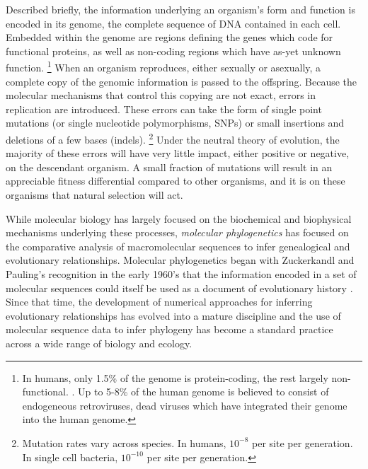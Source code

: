Described briefly, the information underlying an organism's form and function is encoded in its genome, the complete sequence of DNA contained in each cell.
Embedded within the genome are regions defining the genes which code for functional proteins, as well as non-coding regions which have as-yet unknown function.
\footnote{In humans, only 1.5\% of the genome is protein-coding, the rest largely non-functional. \cite{Lander:2001hk}. Up to 5-8\% of the human genome is believed to consist of endogeneous retroviruses, dead viruses which have integrated their genome into the human genome.}
When an organism reproduces, either sexually or asexually, a complete copy of the genomic information is passed to the offspring.
Because the molecular mechanisms that control this copying are not exact, errors in replication are introduced.
These errors can take the form of single point mutations (or single nucleotide polymorphisms, SNPs) or small insertions and deletions of a few bases (indels).
\footnote{Mutation rates vary across species. In humans, $10^{-8}$ per site per generation. In single cell bacteria, $10^{-10}$ per site per generation.}
Under the neutral theory of evolution, the majority of these errors will have very little impact, either positive or negative, on the descendant organism.
A small fraction of mutations will result in an appreciable fitness differential compared to other organisms, and it is on these organisms that natural selection will act.

While molecular biology has largely focused on the biochemical and biophysical mechanisms underlying these processes, \emph{molecular phylogenetics} has focused on the comparative analysis of macromolecular sequences to infer genealogical and evolutionary relationships.
Molecular phylogenetics began with Zuckerkandl and Pauling's recognition in the early 1960's that the information encoded in a set of molecular sequences could itself be used as a document of evolutionary history \cite{Zuckerkandl:1962,Zuckerkandl:1965wi}.
Since that time, the development of numerical approaches for inferring evolutionary relationships has evolved into a mature discipline and the use of molecular sequence data to infer phylogeny has become a standard practice across a wide range of biology and ecology.


